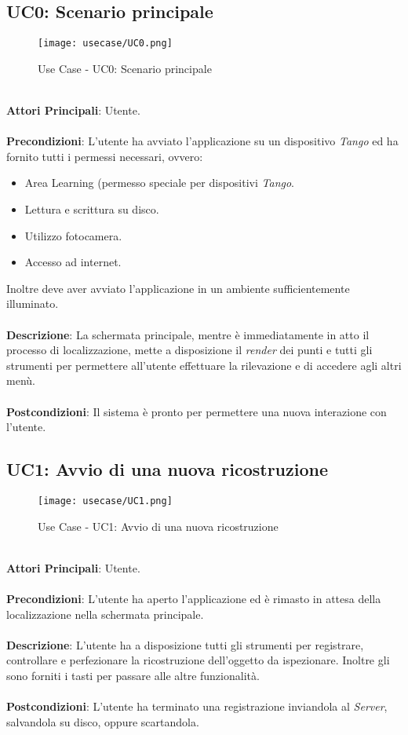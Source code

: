\subsection{UC0: Scenario principale}
\begin{figure}[H] 
    \centering 
    \texttt{[image: usecase/UC0.png]} 
    \caption{Use Case - UC0: Scenario principale}
\end{figure}
\ \\
\textbf{Attori Principali}: Utente.
\\\\ \textbf{Precondizioni}: L'utente ha avviato l'applicazione su un dispositivo \emph{Tango} ed ha fornito tutti i permessi necessari, ovvero:
\begin{itemize}
	\item Area Learning (permesso speciale per dispositivi \emph{Tango}.
	\item Lettura e scrittura su disco.
	\item Utilizzo fotocamera.
	\item Accesso ad internet.
\end{itemize}
Inoltre deve aver avviato l'applicazione in un ambiente sufficientemente illuminato.
\\\\ \textbf{Descrizione}: La schermata principale, mentre è immediatamente in atto il processo di localizzazione, mette a disposizione il \emph{render} dei punti e tutti gli strumenti per permettere all'utente effettuare la rilevazione e di accedere agli altri menù.
\\\\ \textbf{Postcondizioni}: Il sistema è pronto per permettere una nuova interazione con l'utente.


\subsection{UC1: Avvio di una nuova ricostruzione}
\begin{figure}[H] 
    \centering 
    \texttt{[image: usecase/UC1.png]} 
    \caption{Use Case - UC1: Avvio di una nuova ricostruzione}
\end{figure}
\ \\
\textbf{Attori Principali}: Utente.
\\\\ \textbf{Precondizioni}: L'utente ha aperto l'applicazione ed è rimasto in attesa della localizzazione nella schermata principale.
\\\\ \textbf{Descrizione}: L'utente ha a disposizione tutti gli strumenti per registrare, controllare e perfezionare la ricostruzione dell'oggetto da ispezionare. Inoltre gli sono forniti i tasti per passare alle altre funzionalità. 
\\\\ \textbf{Postcondizioni}: L'utente ha terminato una registrazione inviandola al \emph{Server}, salvandola su disco, oppure scartandola.




